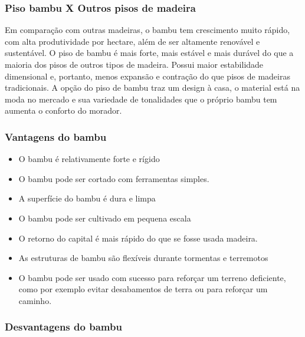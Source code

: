 \subsubsection*{\textbf{Piso bambu X Outros pisos de madeira}}

     Em comparação com outras madeiras, o bambu tem crescimento muito rápido, com alta produtividade por hectare, além de ser altamente renovável e sustentável. O piso de bambu é mais forte, mais estável e mais durável do que a maioria dos pisos de outros tipos de madeira. Possui maior estabilidade dimensional e, portanto, menos expansão e contração do que pisos de madeiras tradicionais. A opção do piso de bambu traz um design à casa, o material está na moda no mercado e sua variedade de tonalidades que o próprio bambu tem aumenta o conforto do morador.



\subsubsection*{\textbf{Vantagens do bambu}}

	\begin{itemize}

		\item O bambu é relativamente forte e rígido

		\item O bambu pode ser cortado com ferramentas simples.

		\item A superfície do bambu é dura e limpa

		\item O bambu pode ser cultivado em pequena escala

		\item O retorno do capital é mais rápido do que se fosse usada madeira.

		\item As estruturas de bambu são flexíveis durante tormentas e terremotos

		\item O bambu pode ser usado com sucesso para reforçar um terreno deficiente, como por exemplo evitar desabamentos de terra ou para reforçar um caminho.
	\end{itemize}

\subsubsection*{\textbf{Desvantagens do bambu}}

